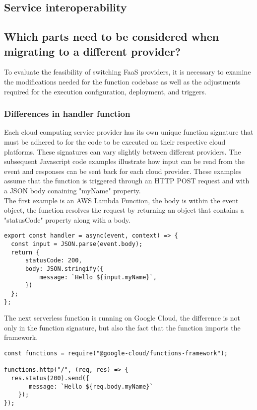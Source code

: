 \subsection{Service interoperability}


\subsection{Which parts need to be considered when migrating to a different provider?}
To evaluate the feasibility of switching \Gls{FaaS} providers, it is necessary to examine the modifications needed for the function codebase as well as the adjustments required for the execution configuration, deployment, and triggers.

\subsubsection{Differences in handler function}
Each cloud computing service provider has its own unique function signature that must be adhered to for the code to be executed on their respective cloud platforms. These signatures can vary slightly between different providers. The subsequent Javascript code examples illustrate how input can be read from the event and responses can be sent back for each cloud provider. These examples assume that the function is triggered through an HTTP POST request and with a JSON body conaining "myName" property. \\
The first example is an AWS Lambda Function, the body is within the event object, the function resolves the request by returning an object that contains a "statusCode" property along with a body.

\begin{lstlisting}[frame=lines, style=ES6, caption={Basic AWS Lambda Function}, showstringspaces=false, captionpos=b,]
export const handler = async(event, context) => {
  const input = JSON.parse(event.body);
  return {
      statusCode: 200,
      body: JSON.stringify({
          message: `Hello ${input.myName}`,
      })
  };
};
\end{lstlisting}
The next \gls{serverless} function is running on Google Cloud, the difference is not only in the function signature, but also the fact that the function imports the framework.

\begin{lstlisting}[frame=lines, style=ES6, caption={Basic Gen. 2 Google Cloud Functions}, showstringspaces=false, captionpos=b,]
const functions = require("@google-cloud/functions-framework");

functions.http("/", (req, res) => {
  res.status(200).send({
       message: `Hello ${req.body.myName}`
    });
});
\end{lstlisting}

